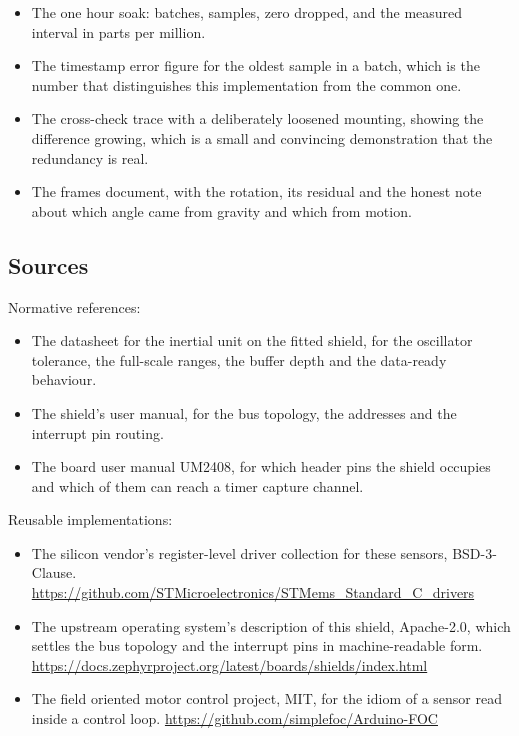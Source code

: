 \begin{itemize}
\item The one hour soak: batches, samples, zero dropped, and the measured
interval in parts per million.
\item The timestamp error figure for the oldest sample in a batch, which is the
number that distinguishes this implementation from the common one.
\item The cross-check trace with a deliberately loosened mounting, showing the
difference growing, which is a small and convincing demonstration that the
redundancy is real.
\item The frames document, with the rotation, its residual and the honest note
about which angle came from gravity and which from motion.
\end{itemize}

\subsection*{Sources}

Normative references:
\begin{itemize}
\item The datasheet for the inertial unit on the fitted shield, for the
oscillator tolerance, the full-scale ranges, the buffer depth and the data-ready
behaviour.
\item The shield's user manual, for the bus topology, the addresses and the
interrupt pin routing.
\item The board user manual UM2408, for which header pins the shield occupies
and which of them can reach a timer capture channel.
\end{itemize}

Reusable implementations:
\begin{itemize}
\item The silicon vendor's register-level driver collection for these sensors,
BSD-3-Clause.\newline
\url{https://github.com/STMicroelectronics/STMems_Standard_C_drivers}
\item The upstream operating system's description of this shield, Apache-2.0,
which settles the bus topology and the interrupt pins in machine-readable
form.\newline
\url{https://docs.zephyrproject.org/latest/boards/shields/index.html}
\item The field oriented motor control project, MIT, for the idiom of a sensor
read inside a control loop.\newline
\url{https://github.com/simplefoc/Arduino-FOC}
\end{itemize}
